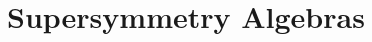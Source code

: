 \documentclass[11pt,a4paper]{article}
\makeatletter
\numberwithin{equation}{subsection}
\newcommand{\checklabel}[2]{%
  \begingroup
  \def\@currentlabel{#2}%
  \label{#1}%
  \endgroup
}
\makeatother
\begin{document}
\setcounter{section}{24}
\section{Supersymmetry Algebras}
\setcounter{subsection}{4}

\checklabel{eq:25.2.7}{25.2.7}
\checklabel{eq:25.2.8}{25.2.8}
\checklabel{eq:25.2.31}{25.2.31}
\checklabel{eq:25.2.32}{25.2.32}
\checklabel{eq:25.3.13}{25.3.13}


\end{document}
